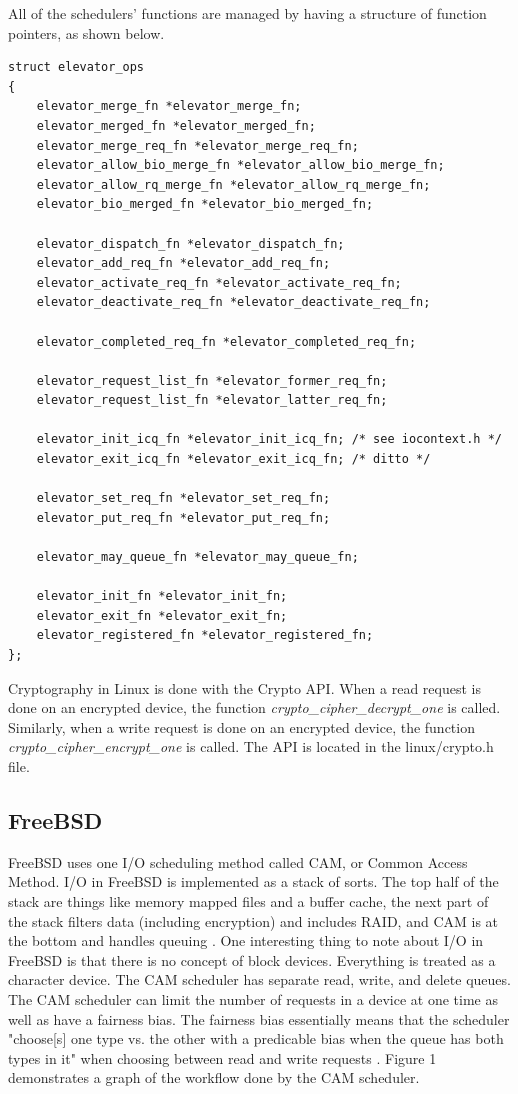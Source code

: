 \documentclass[10pt,draftclsnofoot,onecolumn,journal,compsoc]{IEEEtran}
\begin{document}
All of the schedulers' functions are managed by having a structure of function pointers, as shown below.

\begin{lstlisting}[caption={The \textit{elevator\_ops} structure in the linux/elevator.h file}]
struct elevator_ops
{
	elevator_merge_fn *elevator_merge_fn;
	elevator_merged_fn *elevator_merged_fn;
	elevator_merge_req_fn *elevator_merge_req_fn;
	elevator_allow_bio_merge_fn *elevator_allow_bio_merge_fn;
	elevator_allow_rq_merge_fn *elevator_allow_rq_merge_fn;
	elevator_bio_merged_fn *elevator_bio_merged_fn;

	elevator_dispatch_fn *elevator_dispatch_fn;
	elevator_add_req_fn *elevator_add_req_fn;
	elevator_activate_req_fn *elevator_activate_req_fn;
	elevator_deactivate_req_fn *elevator_deactivate_req_fn;

	elevator_completed_req_fn *elevator_completed_req_fn;

	elevator_request_list_fn *elevator_former_req_fn;
	elevator_request_list_fn *elevator_latter_req_fn;

	elevator_init_icq_fn *elevator_init_icq_fn;	/* see iocontext.h */
	elevator_exit_icq_fn *elevator_exit_icq_fn;	/* ditto */

	elevator_set_req_fn *elevator_set_req_fn;
	elevator_put_req_fn *elevator_put_req_fn;

	elevator_may_queue_fn *elevator_may_queue_fn;

	elevator_init_fn *elevator_init_fn;
	elevator_exit_fn *elevator_exit_fn;
	elevator_registered_fn *elevator_registered_fn;
};
\end{lstlisting}

Cryptography in Linux is done with the Crypto API. When a read request is done on an encrypted device, the function \textit{crypto\_cipher\_decrypt\_one} is called. Similarly, when a write request is done on an encrypted device, the function \textit{crypto\_cipher\_encrypt\_one} is called. The API is located in the linux/crypto.h file.

\subsection{FreeBSD}
FreeBSD uses one I/O scheduling method called CAM, or Common Access Method. I/O in FreeBSD is implemented as a stack of sorts. The top half of the stack are things like memory mapped files and a buffer cache, the next part of the stack filters data (including encryption) and includes RAID, and CAM is at the bottom and handles queuing \cite{bsd1}. One interesting thing to note about I/O in FreeBSD is that there is no concept of block devices. Everything is treated as a character device. The CAM scheduler has separate read, write, and delete queues. The CAM scheduler can limit the number of requests in a device at one time as well as have a fairness bias. The fairness bias essentially means that the scheduler "choose[s] one type vs. the other with a predicable bias when the queue has both types in it" when choosing between read and write requests \cite{bsd2}. Figure 1 demonstrates a graph of the workflow done by the CAM scheduler.
\end{document}
